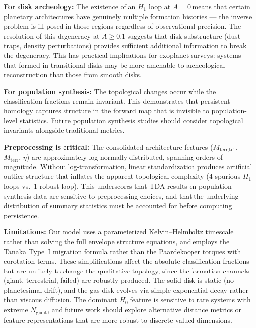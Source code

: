 \documentclass[twocolumn]{aastex631}
\begin{document}
\textbf{For disk archeology:} The existence of an $H_1$ loop at $A = 0$ means
that certain planetary architectures have genuinely multiple formation
histories --- the inverse problem is ill-posed in those regions regardless of
observational precision.  The resolution of this degeneracy at $A \geq 0.1$
suggests that disk substructure (dust traps, density perturbations) provides
sufficient additional information to break the degeneracy.  This has practical
implications for exoplanet surveys: systems that formed in transitional disks
may be more amenable to archeological reconstruction than those from smooth
disks.

\textbf{For population synthesis:} The topological changes occur while the
classification fractions remain invariant.  This demonstrates that persistent
homology captures structure in the forward map that is invisible to
population-level statistics.  Future population synthesis studies should
consider topological invariants alongside traditional metrics.

\textbf{Preprocessing is critical:} The consolidated architecture features
($M_\text{terr,tot}$, $\bar{M}_\text{terr}$, $\eta$) are approximately
log-normally distributed, spanning orders of magnitude.  Without
log-transformation, linear standardization produces artificial outlier
structure that inflates the apparent topological complexity (4 spurious $H_1$
loops vs.\ 1 robust loop).  This underscores that TDA results on population
synthesis data are sensitive to preprocessing choices, and that the underlying
distribution of summary statistics must be accounted for before computing
persistence.

\textbf{Limitations:} Our model uses a parameterized Kelvin--Helmholtz
timescale rather than solving the full envelope structure equations, and
employs the Tanaka Type~I migration formula rather than the Paardekooper
torques with corotation terms.  These simplifications affect the absolute
classification fractions but are unlikely to change the qualitative topology,
since the formation channels (giant, terrestrial, failed) are robustly
produced.  The solid disk is static (no planetesimal drift), and the gas disk
evolves via simple exponential decay rather than viscous diffusion.  The
dominant $H_0$ feature is sensitive to rare systems with extreme $N_\text{giant}$,
and future work should explore alternative distance metrics or feature
representations that are more robust to discrete-valued dimensions.

\end{document}
